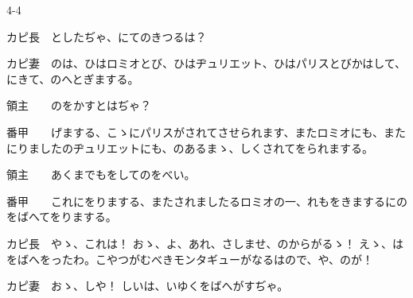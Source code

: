 \documentclass[tate,paper=b6j,jafontsize=9pt]{jlreq}
\begin{document}
\begin{azconvIndented}{4\zw}{-4\zw}

カピ長　としたぢゃ、にてのきつるは？

カピ妻　のは、ひはロミオとび、ひはヂュリエット、ひはパリスとびかはして、にきて、のへとぎまする。

領主　　のをかすとはぢゃ？

番甲　　げまする、こゝにパリスがされてさせられます、またロミオにも、またにりましたのヂュリエットにも、のあるまゝ、しくされてをられまする。

領主　　あくまでもをしてのをべい。

番甲　　これにをりまする、またされましたるロミオの一、れもをきまするにのをばへてをりまする。

カピ長　やゝ、これは！ おゝ、よ、あれ、さしませ、のからがるゝ！ えゝ、はをばへをったわ。こやつがむべきモンタギューがなるはので、や、のが！

カピ妻　おゝ、しや！ しいは、いゆくをばへがすぢゃ。

\end{azconvIndented}
\end{document}
